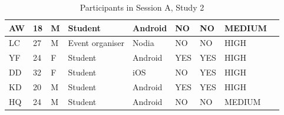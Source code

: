 \begin{table}[H]
{\begin{tabular}{|l|l|l|l|l|l|l|l|l|}
AW       & 18  & M      & Student         & Android                                                         & NO                                                                 & NO                                                                   & MEDIUM                                                       &                                                                    \\ \hline
LC       & 27  & M      & Event organiser & Nodia                                                           & NO                                                                 & NO                                                                   & HIGH                                                         &                                                                    \\ \hline
YF       & 24  & F      & Student         & Android                                                         & YES                                                                & YES                                                                  & HIGH                                                         &                                                                    \\ \hline
DD       & 32  & F      & Student         & iOS                                                             & NO                                                                 & YES                                                                  & HIGH                                                         &                                                                    \\ \hline
KD       & 20  & M      & Student         & Android                                                         & YES                                                                & YES                                                                  & HIGH                                                         &                                                                    \\ \hline
HQ       & 24  & M      & Student         & Android                                                         & NO                                                                 & NO                                                                   & MEDIUM                                                       &                                                                    \\ \hline
\end{tabular}}
\caption{Participants in Session A, Study 2}
\end{table}

